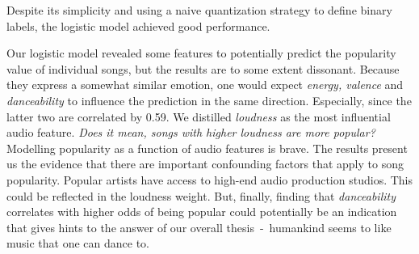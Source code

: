 \documentclass{article}
\begin{document}
Despite its simplicity and using a naive quantization strategy to define binary labels, the logistic model achieved good performance. 



Our logistic model revealed some features to potentially predict the popularity value of individual songs, but the results are to some extent dissonant. Because they express a somewhat similar emotion, one would expect \emph{energy, valence} and \emph{danceability} to influence the prediction in the same direction. Especially, since the latter two are correlated by \num{0.59}.
We distilled \emph{loudness} as the most influential audio feature. 
\emph{Does it mean, songs with higher loudness are more popular?} Modelling popularity as a function of audio features is brave. The results present us the evidence that there are important confounding factors that apply to song popularity. 
Popular artists have access to high-end audio production studios. This could be reflected in the loudness weight.
But, finally, finding that \textit{danceability} correlates with higher odds of being popular could potentially be an indication that gives hints to the answer of our overall thesis~-~humankind seems to like music that one can dance to.



\end{document}
